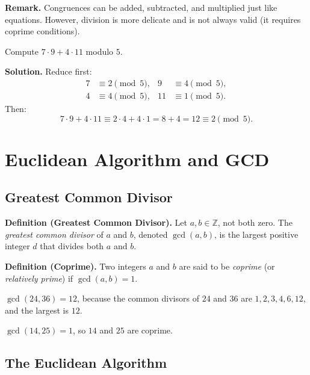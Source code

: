 \documentclass[11pt,a4paper]{article}
\begin{document}
\textbf{Remark.} Congruences can be added, subtracted, and multiplied just like equations. However, division is more delicate and is not always valid (it requires coprime conditions).

\begin{example}
Compute $7 \cdot 9 + 4 \cdot 11$ modulo $5$.

\textbf{Solution.} Reduce first:
\begin{align*}
    7 &\equiv 2 \pmod{5}, & 9 &\equiv 4 \pmod{5}, \\
    4 &\equiv 4 \pmod{5}, & 11 &\equiv 1 \pmod{5}.
\end{align*}
Then:
\begin{equation*}
    7 \cdot 9 + 4 \cdot 11 \equiv 2 \cdot 4 + 4 \cdot 1 = 8 + 4 = 12 \equiv 2 \pmod{5}.
\end{equation*}
\end{example}

\section{Euclidean Algorithm and GCD}

\subsection{Greatest Common Divisor}

\textbf{Definition (Greatest Common Divisor).} Let $a, b \in \mathbb{Z}$, not both zero. The \textit{greatest common divisor} of $a$ and $b$, denoted $\gcd(a, b)$, is the largest positive integer $d$ that divides both $a$ and $b$.

\textbf{Definition (Coprime).} Two integers $a$ and $b$ are said to be \textit{coprime} (or \textit{relatively prime}) if $\gcd(a, b) = 1$.

\begin{example}
$\gcd(24, 36) = 12$, because the common divisors of $24$ and $36$ are $1, 2, 3, 4, 6, 12$, and the largest is $12$.
\end{example}

\begin{example}
$\gcd(14, 25) = 1$, so $14$ and $25$ are coprime.
\end{example}

\subsection{The Euclidean Algorithm}
\end{document}

